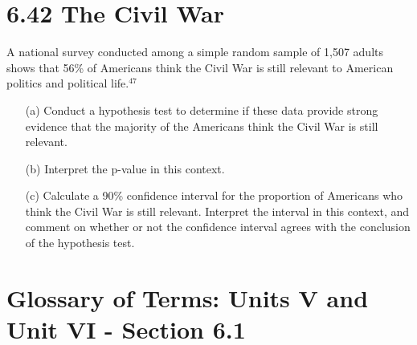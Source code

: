 \documentclass{article}
\begin{document}
\section*{6.42 The Civil War}
A national survey conducted among a simple random sample of 1,507 adults shows that 56\% of Americans think the Civil War is still relevant to American politics and political life.\(^{47}\)
\begin{itemize}
    \item[(a)] Conduct a hypothesis test to determine if these data provide strong evidence that the majority of the Americans think the Civil War is still relevant.
    \item[(b)] Interpret the p-value in this context.
    \item[(c)] Calculate a 90\% confidence interval for the proportion of Americans who think the Civil War is still relevant. Interpret the interval in this context, and comment on whether or not the confidence interval agrees with the conclusion of the hypothesis test.
\end{itemize}

\newpage
\section*{Glossary of Terms: Units V and Unit VI - Section 6.1} 
\end{document}
